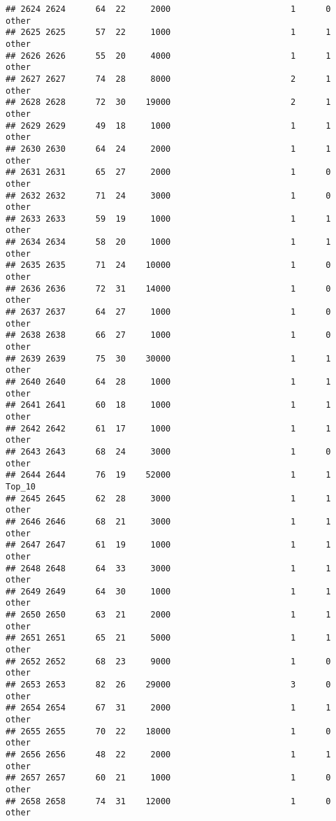 \documentclass[
]{article}
\begin{document}
\begin{verbatim}
## 2624 2624      64  22     2000                        1      0    other
## 2625 2625      57  22     1000                        1      1    other
## 2626 2626      55  20     4000                        1      1    other
## 2627 2627      74  28     8000                        2      1    other
## 2628 2628      72  30    19000                        2      1    other
## 2629 2629      49  18     1000                        1      1    other
## 2630 2630      64  24     2000                        1      1    other
## 2631 2631      65  27     2000                        1      0    other
## 2632 2632      71  24     3000                        1      0    other
## 2633 2633      59  19     1000                        1      1    other
## 2634 2634      58  20     1000                        1      1    other
## 2635 2635      71  24    10000                        1      0    other
## 2636 2636      72  31    14000                        1      0    other
## 2637 2637      64  27     1000                        1      0    other
## 2638 2638      66  27     1000                        1      0    other
## 2639 2639      75  30    30000                        1      1    other
## 2640 2640      64  28     1000                        1      1    other
## 2641 2641      60  18     1000                        1      1    other
## 2642 2642      61  17     1000                        1      1    other
## 2643 2643      68  24     3000                        1      0    other
## 2644 2644      76  19    52000                        1      1   Top_10
## 2645 2645      62  28     3000                        1      1    other
## 2646 2646      68  21     3000                        1      1    other
## 2647 2647      61  19     1000                        1      1    other
## 2648 2648      64  33     3000                        1      1    other
## 2649 2649      64  30     1000                        1      1    other
## 2650 2650      63  21     2000                        1      1    other
## 2651 2651      65  21     5000                        1      1    other
## 2652 2652      68  23     9000                        1      0    other
## 2653 2653      82  26    29000                        3      0    other
## 2654 2654      67  31     2000                        1      1    other
## 2655 2655      70  22    18000                        1      0    other
## 2656 2656      48  22     2000                        1      1    other
## 2657 2657      60  21     1000                        1      0    other
## 2658 2658      74  31    12000                        1      0    other

\end{verbatim}
\end{document}
